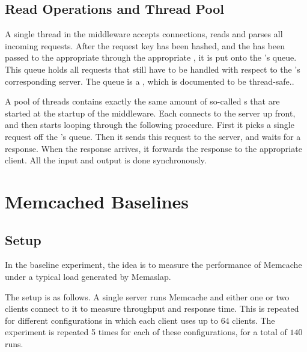\documentclass[11pt]{article}
\begin{document}
\subsection{Read Operations and Thread Pool}\label{sec:desc:reads}

%

A single thread in the middleware accepts connections, reads and parses all incoming requests.
After the request key has been hashed, and the  has been passed to the appropriate  through the appropriate , it is put onto the 's queue.
This queue holds all requests that still have to be handled with respect to the 's corresponding server.
The queue is a , which is documented to be thread-safe.\cite{javaBlockingQueueSafe}.

A pool of threads contains exactly the same amount of so-called s that are started at the startup of the middleware.
Each  connects to the server up front, and then starts looping through the following procedure.
First it picks a single request off the 's queue.
Then it sends this request to the server, and waits for a response.
When the response arrives, it forwards the response to the appropriate client.
All the input and output is done synchronously.


\section{Memcached Baselines}\label{sec:baseline}

\subsection{Setup}


In the baseline experiment, the idea is to measure the performance of Memcache under a typical load generated by Memaslap.

The setup is as follows.
A single server runs Memcache and either one or two clients connect to it to measure throughput and response time.
This is repeated for different configurations in which each client uses up to $64$ clients.
The experiment is repeated 5 times for each of these configurations, for a total of $140$ runs.
\end{document}
